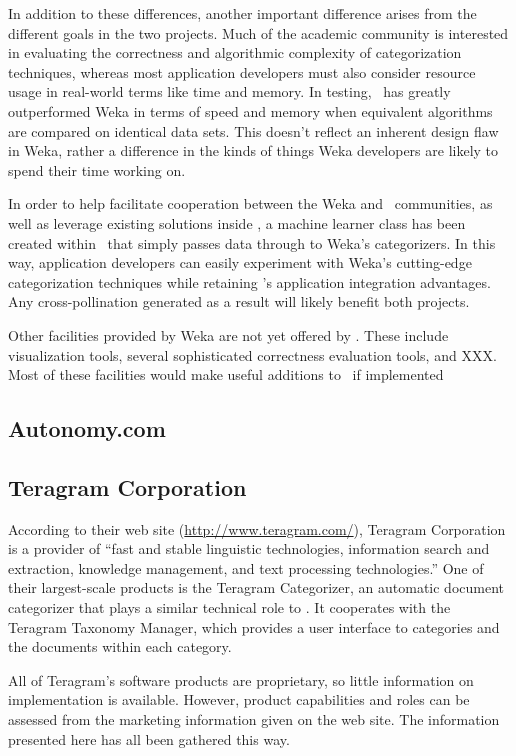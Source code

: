 In addition to these differences, another important difference arises
from the different goals in the two projects.  Much of the academic
community is interested in evaluating the correctness and algorithmic
complexity of categorization techniques, whereas most application
developers must also consider resource usage in real-world terms like
time and memory.  In testing, \aicat\ has greatly outperformed
Weka in terms of speed and memory when equivalent algorithms are
compared on identical data sets.  This doesn't reflect an inherent
design flaw in Weka, rather a difference in the kinds of things Weka
developers are likely to spend their time working on.

In order to help facilitate cooperation between the Weka and
\aicat\ communities, as well as leverage existing solutions
inside \aicat, a machine learner class has been created
within \aicat\ that simply passes data through to Weka's
categorizers.  In this way, application developers can easily
experiment with Weka's cutting-edge categorization techniques while
retaining \aicat's application integration advantages.  Any
cross-pollination generated as a result will likely benefit both
projects.

Other facilities provided by Weka are not yet offered by
\aicat.  These include visualization tools, several
sophisticated correctness evaluation tools, and XXX.  Most of these
facilities would make useful additions to \aicat\ if
implemented

\subsection{Autonomy.com}

\subsection{Teragram Corporation}

According to their web site (\url{http://www.teragram.com/}), Teragram
Corporation is a provider of ``fast and stable linguistic
technologies, information search and extraction, knowledge management,
and text processing technologies.''  One of their largest-scale
products is the Teragram Categorizer, an automatic document
categorizer that plays a similar technical role to \aicat.
It cooperates with the Teragram Taxonomy Manager, which provides a
user interface to categories and the documents within each category.

All of Teragram's software products are proprietary, so little
information on implementation is available.  However, product
capabilities and roles can be assessed from the marketing information
given on the web site.  The information presented here has all been
gathered this way.

